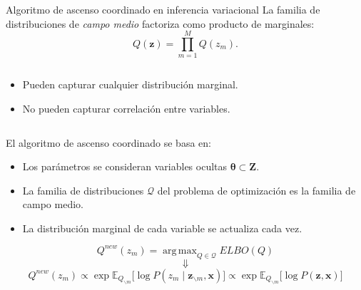 \documentclass[aspectratio=169]{beamer}
\newcommand{\bx}{\bm{x}}
\newcommand{\bz}{\bm{z}}
\newcommand{\bZ}{\bm{Z}}
\newcommand{\btheta}{\bm{\theta}}
\DeclareMathOperator*{\argmax}{arg\,max}
\newcommand\E[2]{\mathbb{E}_{#1}\Big[#2\Big]}
\begin{document}
  \begin{frame}{Algoritmo de ascenso coordinado en inferencia variacional}
    La familia de distribuciones de \emph{campo medio} factoriza como producto de marginales:
    \[
      Q(\bz) = \prod_{m=1}^{M}Q(z_{m}).
    \]
    \begin{columns}
      \begin{column}{0.5\textwidth}
        \begin{itemize}
          \item Pueden capturar cualquier distribución marginal.
          \item No pueden capturar correlación entre variables.
        \end{itemize}
      \end{column}
      \begin{column}{0.5\textwidth}
      \end{column}
    \end{columns}
  \end{frame}

  \begin{frame}
    El algoritmo de ascenso coordinado se basa en:
    \begin{itemize}
      \item Los parámetros se consideran variables ocultas \(\btheta \subset \bZ\).
      \item La familia de distribuciones \(\mathcal{Q}\) del problema de optimización es la familia de campo medio.
      \item La distribución marginal de cada variable se actualiza cada vez.
    \end{itemize}
    \[
      Q^{new}(z_{m}) = \argmax_{Q \in \mathcal{Q}} ELBO(Q)
    \]
    \[
      \Downarrow
    \]
    \[
      Q^{new}(z_{m}) \propto \exp \E{Q_{\backslash m}}{\log P(z_{m} \mid \bz_{\backslash m}, \bx)} \propto \exp \E{Q_{\backslash m}}{\log P(\bz, \bx)}
    \]
  \end{frame}
\end{document}
